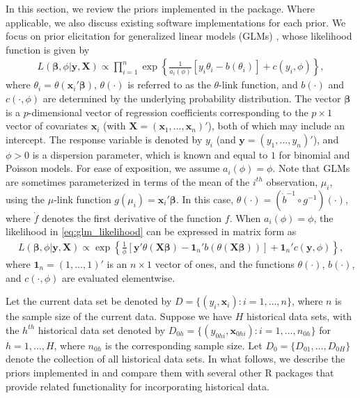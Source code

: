 In this section, we review the priors implemented in the  package.
Where applicable, we also discuss existing software implementations for each prior. We focus on prior elicitation for generalized linear models (GLMs) \citep{mccullagh1989generalized}, whose likelihood function is given by
\begin{align}
    L(\bm{\beta}, \phi | \bm{y}, \bm{X}) \propto \prod_{i=1}^n \exp\left\{ \frac{1}{a_i(\phi)}\left[ y_i \theta_i - b(\theta_i) \right] + c(y_i, \phi) \right\},
    \label{eq:glm_likelihood}
\end{align}
where $\theta_i = \theta(\bm{x}_i'\bm{\beta})$, $\theta(\cdot)$ is referred to as the $\theta$-link function, and $b(\cdot)$ and $c(\cdot, \phi)$ are determined by the underlying probability distribution. The vector $\bm{\beta}$ is a $p$-dimensional vector of regression coefficients corresponding to the $p \times 1$ vector of covariates $\bm{x}_i$ (with $\bm{X} = (\bm{x}_1, \ldots, \bm{x}_n)'$), both of which may include an intercept. The response variable is denoted by $y_i$ (and $\bm{y} = (y_1, \ldots, y_n)'$), and $\phi > 0$ is a dispersion parameter, which is known and equal to $1$ for binomial and Poisson models.
For ease of exposition, we assume $a_i(\phi) = \phi$. Note that GLMs are sometimes parameterized in terms of the mean of the $i^{th}$ observation, $\mu_i$, using the $\mu$-link function $g(\mu_i) = \bm{x}_i'\bm{\beta}$.
In this case, $\theta(\cdot) = (\dot{b}^{-1} \circ g^{-1})(\cdot)$, where $\dot{f}$ denotes the first derivative of the function $f$.
When $a_i(\phi) = \phi$, the likelihood in \eqref{eq:glm_likelihood} can be expressed in matrix form as
\begin{align}
    L(\bm{\beta}, \phi | \bm{y}, \bm{X}) \propto
         \exp\left\{ \frac{1}{\phi} \left[ \bm{y}'\theta(\bm{X} \bm{\beta}) - \bm{1}_n' b(\theta(\bm{X}\bm{\beta})) \right]
         + \bm{1}_n' c(\bm{y}, \phi)
         \right\},
         \label{eq:glm_likelihood_matrix}
\end{align}
where $\bm{1}_n = (1, \ldots, 1)'$ is an $n\times 1$ vector of ones, and the functions $\theta(\cdot)$, $b(\cdot)$, and $c(\cdot, \phi)$ are evaluated elementwise.

Let the current data set be denoted by $D = \{ (y_i, \bm{x}_i): i = 1, \ldots, n \}$, where $n$ is the sample size of the current data. Suppose we have $H$ historical data sets, with the $h^{th}$ historical data set denoted by $D_{0h} = \{ (y_{0hi}, \bm{x}_{0hi}): i = 1, \ldots, n_{0h} \}$ for $h = 1, \ldots, H$, where $n_{0h}$ is the corresponding sample size. Let $D_0 = \{D_{01}, \ldots, D_{0H}\}$ denote the collection of all historical data sets. In what follows, we describe the priors implemented in  and compare them with several other R packages that provide related functionality for incorporating historical data. 

